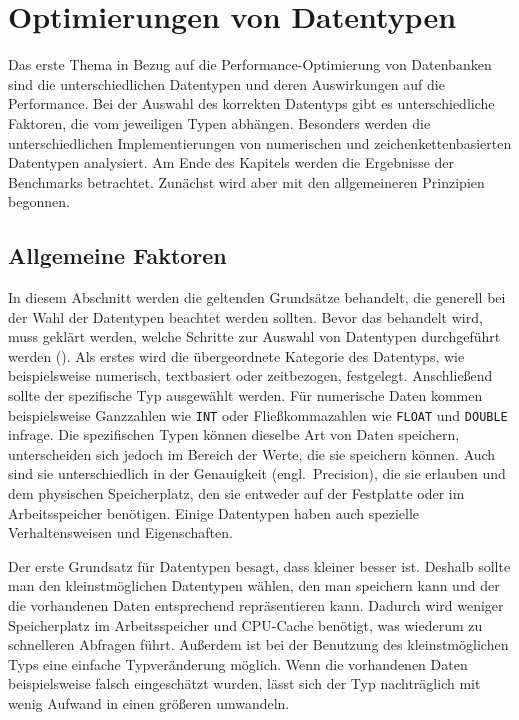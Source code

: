 
\chapter{Optimierungen von Datentypen}\label{ch:data-types}

Das erste Thema in Bezug auf die Performance-Optimierung von Datenbanken sind die unterschiedlichen Datentypen und deren Auswirkungen auf die Performance.
Bei der Auswahl des korrekten Datentyps gibt es unterschiedliche Faktoren, die vom jeweiligen Typen abhängen.
Besonders werden die unterschiedlichen Implementierungen von numerischen und zeichenkettenbasierten Datentypen analysiert.
Am Ende des Kapitels werden die Ergebnisse der Benchmarks betrachtet.
Zunächst wird aber mit den allgemeineren Prinzipien begonnen.

\section{Allgemeine Faktoren}\label{sec:data-types-allgemeine-faktoren}

In diesem Abschnitt werden die geltenden Grundsätze behandelt, die generell bei der Wahl der Datentypen beachtet werden sollten.
Bevor das behandelt wird, muss geklärt werden, welche Schritte zur Auswahl von Datentypen durchgeführt werden (\cite[S. 115--145]{schwartz2012high}).
Als erstes wird die übergeordnete Kategorie des Datentyps, wie beispielsweise numerisch, textbasiert oder zeitbezogen, festgelegt.
Anschließend sollte der spezifische Typ ausgewählt werden.
Für numerische Daten kommen beispielsweise Ganzzahlen wie \texttt{INT} oder Fließkommazahlen wie \texttt{FLOAT} und \texttt{DOUBLE} infrage.
Die spezifischen Typen können dieselbe Art von Daten speichern, unterscheiden sich jedoch im Bereich der Werte, die sie speichern können.
Auch sind sie unterschiedlich in der Genauigkeit (engl.\ Precision), die sie erlauben und dem physischen Speicherplatz, den sie entweder auf der Festplatte oder im Arbeitsspeicher benötigen.
Einige Datentypen haben auch spezielle Verhaltensweisen und Eigenschaften.

Der erste Grundsatz für Datentypen besagt, dass kleiner besser ist.
Deshalb sollte man den kleinstmöglichen Datentypen wählen, den man speichern kann und der die vorhandenen Daten entsprechend repräsentieren kann.
Dadurch wird weniger Speicherplatz im Arbeitsspeicher und CPU-Cache benötigt, was wiederum zu schnelleren Abfragen führt.
Außerdem ist bei der Benutzung des kleinstmöglichen Typs eine einfache Typveränderung möglich.
Wenn die vorhandenen Daten beispielsweise falsch eingeschätzt wurden, lässt sich der Typ nachträglich mit wenig Aufwand in einen größeren umwandeln.

